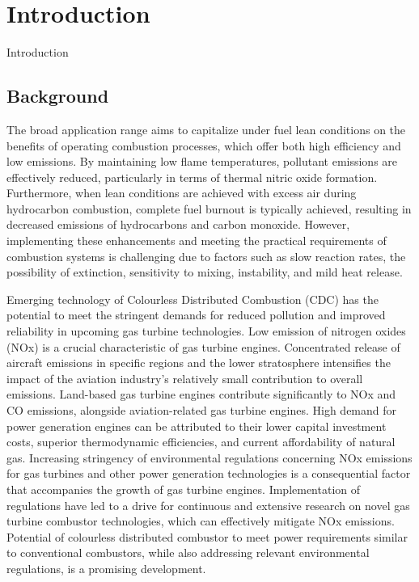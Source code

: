 \chapter[Introduction]{Introduction}{Introduction}\label{CH1:Intro}

\section{Background}
The broad application range aims to capitalize under fuel lean conditions on the benefits of operating combustion processes, which offer both high efficiency and low emissions. By maintaining low flame temperatures, pollutant emissions are effectively reduced, particularly in terms of thermal nitric oxide formation. Furthermore, when lean conditions are achieved with excess air during hydrocarbon combustion, complete fuel burnout is typically achieved, resulting in decreased emissions of hydrocarbons and carbon monoxide. However, implementing these enhancements and meeting the practical requirements of combustion systems is challenging due to factors such as slow reaction rates, the possibility of extinction, sensitivity to mixing, instability, and mild heat release.

Emerging technology of Colourless Distributed Combustion (CDC) \cite{VAThesis2011,VA2011} has the potential to meet the stringent demands for reduced pollution and improved reliability in upcoming gas turbine technologies. Low emission of nitrogen oxides (NOx) is a crucial characteristic of gas turbine engines. Concentrated release of aircraft emissions in specific regions and the lower stratosphere intensifies the impact of the aviation industry's relatively small contribution to overall emissions. Land-based gas turbine engines contribute significantly to NOx and CO emissions, alongside aviation-related gas turbine engines. High demand for power generation engines can be attributed to their lower capital investment costs, superior thermodynamic efficiencies, and current affordability of natural gas. Increasing stringency of environmental regulations concerning NOx emissions for gas turbines and other power generation technologies is a consequential factor that accompanies the growth of gas turbine engines. Implementation of regulations have led to a drive for continuous and extensive research on novel gas turbine combustor technologies, which can effectively mitigate NOx emissions. Potential of colourless distributed combustor to meet power requirements similar to conventional combustors, while also addressing relevant environmental regulations, is a promising development.


